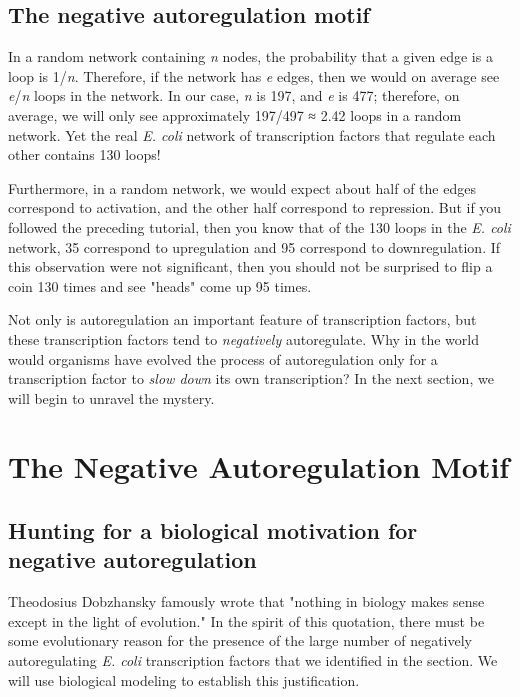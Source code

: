 \FloatBarrier
{}
\subsection{The negative autoregulation motif}

In a random network containing \textit{n} nodes, the probability that a given edge is a loop is 1/\textit{n}. Therefore, if the network has \textit{e} edges, then we would on average see \textit{e}/\textit{n} loops in the network. In our case, \textit{n} is 197, and \textit{e} is 477; therefore, on average, we will only see approximately 197/497 ≈ 2.42 loops in a random network. Yet the real \textit{E. coli} network of transcription factors that regulate each other contains 130 loops!

Furthermore, in a random network, we would expect about half of the edges correspond to activation, and the other half correspond to repression. But if you followed the preceding tutorial, then you know that of the 130 loops in the \textit{E. coli} network, 35 correspond to upregulation and 95 correspond to downregulation. If this observation were not significant, then you should not be surprised to flip a coin 130 times and see "heads" come up 95 times.

Not only is autoregulation an important feature of transcription factors, but these transcription factors tend to \textit{negatively} autoregulate. Why in the world would organisms have evolved the process of autoregulation only for a transcription factor to \textit{slow down} its own transcription? In the next section, we will begin to unravel the mystery.


\FloatBarrier
{}

\section{The Negative Autoregulation Motif}
\label{sec:the_negative_autoregulation_motif}

\subsection{Hunting for a biological motivation for negative autoregulation}

Theodosius Dobzhansky famously wrote that "nothing in biology makes sense except in the light of evolution." In the spirit of this quotation, there must be some evolutionary reason for the presence of the large number of negatively autoregulating \textit{E. coli} transcription factors that we identified in the section. We will use biological modeling to establish this justification.

